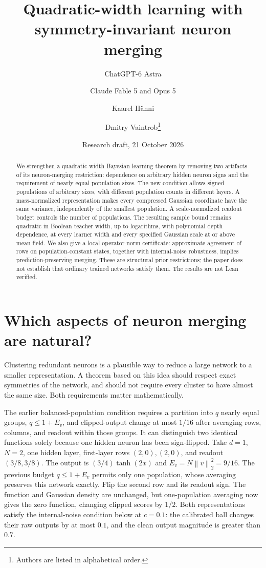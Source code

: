 \documentclass[11pt]{article}
\title{Quadratic-width learning with\protect\\symmetry-invariant neuron merging}
\author{ChatGPT-6 Astra \and Claude Fable 5 and Opus 5 \and Kaarel H\"anni \and Dmitry Vaintrob\thanks{Authors are listed in alphabetical order.}}
\date{Research draft, 21 October 2026}
\newcommand{\norm}[1]{\left\|#1\right\|}
\begin{document}
\maketitle
\begin{abstract}
We strengthen a quadratic-width Bayesian learning theorem by removing two
artifacts of its neuron-merging restriction: dependence on arbitrary hidden
neuron signs and the requirement of nearly equal population sizes. The
new condition allows signed populations of arbitrary sizes, with different
population counts in different layers. A mass-normalized representation
makes every compressed Gaussian coordinate have the same variance,
independently of the smallest population. A scale-normalized readout budget
controls the number of populations. The resulting sample bound remains
quadratic in Boolean teacher width, up to logarithms, with polynomial depth
dependence, at every learner width and every specified Gaussian scale at or
above mean field. We also give a local operator-norm certificate: approximate
agreement of rows on population-constant states, together with internal-noise
robustness, implies prediction-preserving merging. These are structural
prior restrictions; the paper does not establish that ordinary trained
networks satisfy them. The results are not Lean verified.
\end{abstract}

\section{Which aspects of neuron merging are natural?}

Clustering redundant neurons is a plausible way to reduce a large network
to a smaller representation. A theorem based on this idea should respect
exact symmetries of the network, and should not require every cluster to
have almost the same size. Both requirements matter mathematically.

The earlier balanced-population condition requires a partition into $q$
nearly equal groups, $q\le1+E_v$, and clipped-output change at most
$1/16$ after averaging rows, columns, and readout within those groups.
It can distinguish two identical
functions solely because one hidden neuron has been sign-flipped. Take
$d=1$, $N=2$, one hidden layer, first-layer rows $(2,0),(2,0)$, and readout
$(3/8,3/8)$. The output is $(3/4)\tanh(2x)$ and $E_v=N\norm v_2^2=9/16$.
The previous budget $q\le1+E_v$ permits only one population, whose averaging
preserves this network exactly. Flip the second row and its readout sign.
The function and Gaussian density are unchanged, but one-population
averaging now gives the zero function, changing clipped scores by $1/2$.
Both representations satisfy the internal-noise condition below at $c=0.1$:
the calibrated ball changes their raw outputs by at most $0.1$, and the
clean output magnitude is greater than $0.7$.
\end{document}

